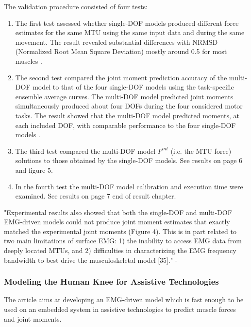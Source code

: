 The validation procedure consisted of four tests:
\begin{enumerate}
    \item The first test assessed whether single-DOF models produced different force estimates for the same MTU using the same input data and during the same movement. The result revealed substantial differences with NRMSD (Normalized Root Mean Square Deviation) mostly around 0.5 for most muscles \cite[Fig. 3]{Sartori2012a}.
    \item The second test compared the joint moment prediction accuracy of the multi-DOF model to that of the four single-DOF models using the task-specific ensemble average curves. The multi-DOF model predicted joint moments simultaneously produced about four DOFs during the four considered motor tasks. The result showed that the multi-DOF model predicted moments, at each included DOF, with comparable performance to the four single-DOF models \cite[Fig. 4]{Sartori2012a}.
    \item The third test compared the multi-DOF model $F^{mt}$ (i.e. the MTU force) solutions to those obtained by the single-DOF models. See results on page 6 and figure 5.
    \item In the fourth test the multi-DOF model calibration and execution time were examined. See results on page 7 end of result chapter.
\end{enumerate}

"Experimental results also showed that both the single-DOF and multi-DOF EMG-driven models could not produce joint moment estimates that exactly matched the experimental joint moments (Figure 4). This is in part related to two main limitations of surface EMG: 1) the inability to access EMG data from deeply located MTUs, and 2) difficulties in characterizing the EMG frequency bandwidth to best drive the musculoskeletal model [35]." - \cite[p. 11]{Sartori2012a}

\subsubsection{Modeling the Human Knee for Assistive Technologies}

The article aims at developing an EMG-driven model which is fast enough to be used on an embedded system in assistive technologies to predict muscle forces and joint moments.

